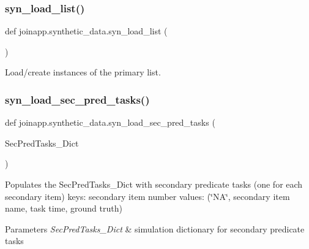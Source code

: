 \subsubsection{\texorpdfstring{syn\_load\_list()}{syn\_load\_list()}}
{\footnotesize\ttfamily def joinapp.\+synthetic\+\_\+data.\+syn\+\_\+load\+\_\+list (\begin{DoxyParamCaption}{ }\end{DoxyParamCaption})}



Load/create instances of the primary list. 

\mbox{\label{namespacejoinapp_1_1synthetic__data_ad810e597b5840cec557a1878d90c6589}} 
\subsubsection{\texorpdfstring{syn\_load\_sec\_pred\_tasks()}{syn\_load\_sec\_pred\_tasks()}}
{\footnotesize\ttfamily def joinapp.\+synthetic\+\_\+data.\+syn\+\_\+load\+\_\+sec\+\_\+pred\+\_\+tasks (\begin{DoxyParamCaption}\item[{}]{Sec\+Pred\+Tasks\+\_\+\+Dict }\end{DoxyParamCaption})}



Populates the Sec\+Pred\+Tasks\+\_\+\+Dict with secondary predicate tasks (one for each secondary item) keys\+: secondary item number values\+: (\char`\"{}\+N\+A\char`\"{}, secondary item name, task time, ground truth) 


\begin{DoxyParams}{Parameters}
{\em Sec\+Pred\+Tasks\+\_\+\+Dict} & simulation dictionary for secondary predicate tasks \\
\hline
\end{DoxyParams}
